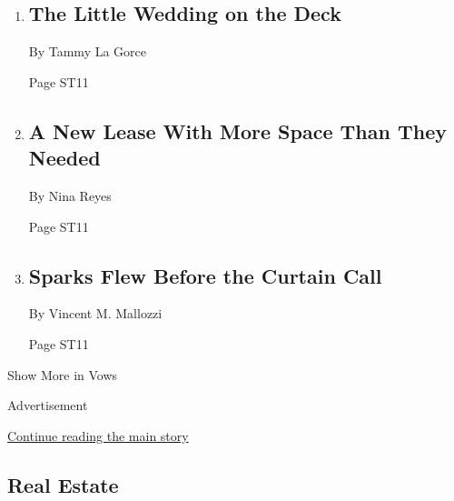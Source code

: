 \begin{enumerate}
\def\labelenumi{\arabic{enumi}.}
\item
  \href{/2020/05/08/fashion/weddings/the-little-wedding-on-the-deck.html}{}

  \hypertarget{the-little-wedding-on-the-deck}{%
  \subsection{The Little Wedding on the
  Deck}\label{the-little-wedding-on-the-deck}}

  By Tammy La Gorce

  Page ST11
\item
  \href{/2020/05/09/fashion/weddings/a-new-lease-with-more-space-than-they-needed.html}{}

  \hypertarget{a-new-lease-with-more-space-than-they-needed}{%
  \subsection{A New Lease With More Space Than They
  Needed}\label{a-new-lease-with-more-space-than-they-needed}}

  By Nina Reyes

  Page ST11
\item
  \href{/2020/05/09/fashion/weddings/sparks-flew-before-the-curtain-call.html}{}

  \hypertarget{sparks-flew-before-the-curtain-call}{%
  \subsection{Sparks Flew Before the Curtain
  Call}\label{sparks-flew-before-the-curtain-call}}

  By Vincent M. Mallozzi

  Page ST11
\end{enumerate}

Show More in Vows

Advertisement

\protect\hyperlink{after-mid8}{Continue reading the main story}

\hypertarget{real-estate}{%
\subsection{Real Estate}\label{real-estate}}

